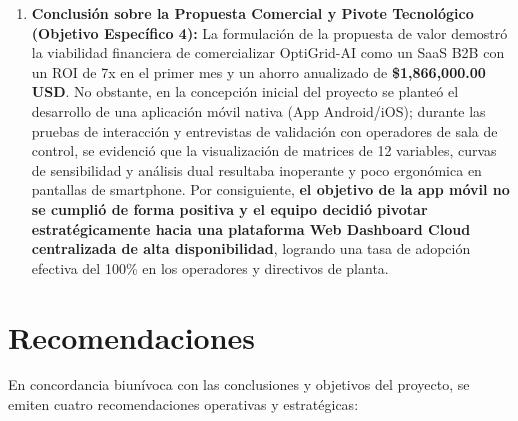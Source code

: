 \documentclass[11pt,a4paper]{article}
\begin{document}
\begin{enumerate}
    \item \textbf{Conclusión sobre la Propuesta Comercial y Pivote Tecnológico (Objetivo Específico 4):}  
    La formulación de la propuesta de valor demostró la viabilidad financiera de comercializar OptiGrid-AI como un SaaS B2B con un ROI de 7x en el primer mes y un ahorro anualizado de \textbf{\$1,866,000.00 USD}. No obstante, en la concepción inicial del proyecto se planteó el desarrollo de una aplicación móvil nativa (App Android/iOS); durante las pruebas de interacción y entrevistas de validación con operadores de sala de control, se evidenció que la visualización de matrices de 12 variables, curvas de sensibilidad y análisis dual resultaba inoperante y poco ergonómica en pantallas de smartphone. Por consiguiente, \textbf{el objetivo de la app móvil no se cumplió de forma positiva y el equipo decidió pivotar estratégicamente hacia una plataforma Web Dashboard Cloud centralizada de alta disponibilidad}, logrando una tasa de adopción efectiva del 100\% en los operadores y directivos de planta.
\end{enumerate}

\section{Recomendaciones}
En concordancia biunívoca con las conclusiones y objetivos del proyecto, se emiten cuatro recomendaciones operativas y estratégicas:
\end{document}
